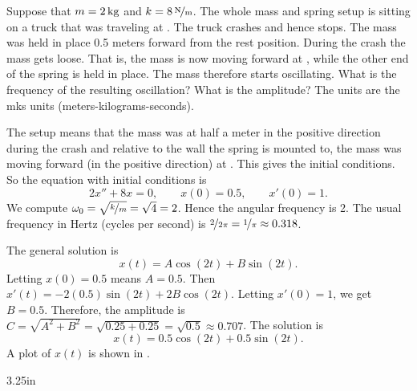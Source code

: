 \begin{example}
Suppose that $m=\unit[2]{kg}$ and $k=\unitfrac[8]{N}{m}$.
The whole mass and spring setup is sitting on
a truck that was traveling at .
The truck crashes and hence stops.
The mass was held in place 0.5 meters forward from the rest position.  During
the crash the mass gets loose.  That is, the mass is now 
moving forward at , while the other end of the
spring is held
in place.  The mass therefore starts oscillating.
What is the frequency of the resulting oscillation?  What is the amplitude?
The units are the mks units (meters-kilograms-seconds).

The setup means that the mass was at half a meter in the positive
direction during the crash and
relative to the wall the spring is mounted to, the mass was moving forward
(in the positive direction) at .  This gives the initial
conditions.
So the equation with initial conditions is
\begin{equation*}
2 x'' + 8 x = 0 , \qquad x(0) = 0.5, \qquad x'(0) = 1.
\end{equation*}
We compute $\omega_0 = \sqrt{\nicefrac{k}{m}} = \sqrt{4} = 2$.
Hence the angular frequency is 2.  The usual frequency in Hertz (cycles per
second) is $\nicefrac{2}{2\pi} = \nicefrac{1}{\pi} \approx 0.318$.

The general solution is
\begin{equation*}
x(t) = A \cos (2t) + B \sin (2t) .
\end{equation*}
Letting $x(0) = 0.5$ means $A = 0.5$.  Then $x'(t) = - 2(0.5) \sin (2t)
+ 2B \cos (2t)$.
Letting $x'(0) = 1$, we get $B = 0.5$.  Therefore, the amplitude is
$C = \sqrt{A^2+B^2} = \sqrt{0.25+0.25} = \sqrt{0.5} \approx 0.707$.  The solution is
\begin{equation*}
x(t) = 0.5 \cos (2t) + 0.5 \sin (2t) .
\end{equation*}
A plot of $x(t)$ is shown in .
\end{example}

\begin{mywrapfig}[15]{3.25in}
\capstart
{}
\caption{Simple undamped oscillation.\label{mv:undampedfig}}
\end{mywrapfig}


